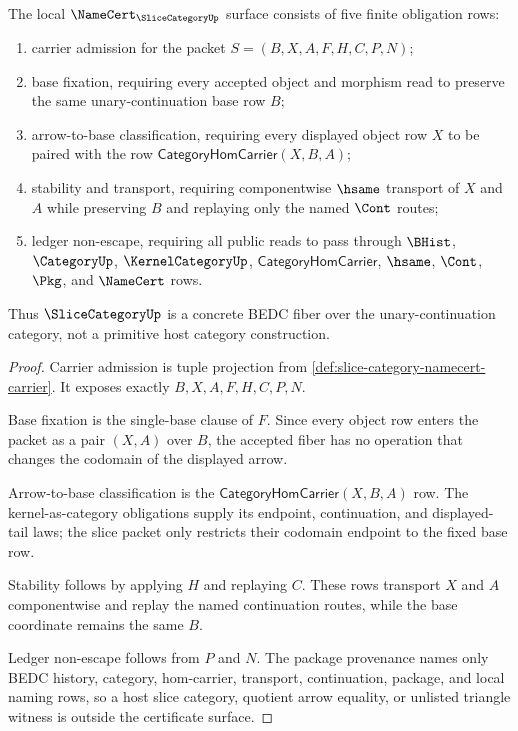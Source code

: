 \begin{theorem}
\label{thm:slice-category-namecert-obligation-surface}
The local $\NameCert_{\SliceCategoryUp}$ surface consists of five finite obligation rows:
\begin{enumerate}
\item carrier admission for the packet $S=(B,X,A,F,H,C,P,N)$;
\item base fixation, requiring every accepted object and morphism read to preserve the same unary-continuation base row $B$;
\item arrow-to-base classification, requiring every displayed object row $X$ to be paired with the row $\mathsf{CategoryHomCarrier}(X,B,A)$;
\item stability and transport, requiring componentwise $\hsame$ transport of $X$ and $A$ while preserving $B$ and replaying only the named $\Cont$ routes;
\item ledger non-escape, requiring all public reads to pass through $\BHist$, $\CategoryUp$, $\KernelCategoryUp$, $\mathsf{CategoryHomCarrier}$, $\hsame$, $\Cont$, $\Pkg$, and $\NameCert$ rows.
\end{enumerate}
Thus $\SliceCategoryUp$ is a concrete BEDC fiber over the unary-continuation category, not a primitive host category construction.
\end{theorem}
\begin{proof}
Carrier admission is tuple projection from \autoref{def:slice-category-namecert-carrier}. It exposes exactly $B,X,A,F,H,C,P,N$.

Base fixation is the single-base clause of $F$. Since every object row enters the packet as a pair $(X,A)$ over $B$, the accepted fiber has no operation that changes the codomain of the displayed arrow.

Arrow-to-base classification is the $\mathsf{CategoryHomCarrier}(X,B,A)$ row. The kernel-as-category obligations supply its endpoint, continuation, and displayed-tail laws; the slice packet only restricts their codomain endpoint to the fixed base row.

Stability follows by applying $H$ and replaying $C$. These rows transport $X$ and $A$ componentwise and replay the named continuation routes, while the base coordinate remains the same $B$.

Ledger non-escape follows from $P$ and $N$. The package provenance names only BEDC history, category, hom-carrier, transport, continuation, package, and local naming rows, so a host slice category, quotient arrow equality, or unlisted triangle witness is outside the certificate surface.
\end{proof}

